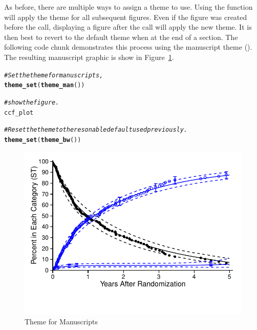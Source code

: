 \documentclass[nojss, letterpaper]{jss}\usepackage[]{graphicx}\usepackage[]{color}
\makeatletter
\def\maxwidth{ %
  \ifdim\Gin@nat@width>\linewidth
    \linewidth
  \else
    \Gin@nat@width
  \fi
}
\newcommand{\hlcom}[1]{\textcolor[rgb]{0.678,0.584,0.686}{\textit{#1}}}%
\newcommand{\hlstd}[1]{\textcolor[rgb]{0.345,0.345,0.345}{#1}}%
\newcommand{\hlkwd}[1]{\textcolor[rgb]{0.737,0.353,0.396}{\textbf{#1}}}%
\newenvironment{kframe}{%
 \def\at@end@of@kframe{}%
 \ifinner\ifhmode%
  \def\at@end@of@kframe{\end{minipage}}%
  \begin{minipage}{\columnwidth}%
 \fi\fi%
 \def\FrameCommand##1{\hskip\@totalleftmargin \hskip-\fboxsep
 \colorbox{shadecolor}{##1}\hskip-\fboxsep
     \hskip-\linewidth \hskip-\@totalleftmargin \hskip\columnwidth}%
 \MakeFramed {\advance\hsize-\width
   \@totalleftmargin\z@ \linewidth\hsize
   \@setminipage}}%
 {\par\unskip\endMakeFramed%
 \at@end@of@kframe}
\newenvironment{knitrout}{}{} %
\makeatother
\begin{document}
As before, there are multiple ways to assign a theme to use. Using the  function will apply the theme for all subsequent figures. Even if the figure was created before the  call, displaying a figure after the call will apply the new theme. It is then best to revert to the default theme when at the end of a section. The following code chunk demonstrates this process using the manuscript theme (). The resulting manuscript graphic is show in Figure~\ref{F:manuscriptTheme}.
\begin{knitrout}\footnotesize
{}\color{fgcolor}\begin{kframe}
\begin{alltt}
\hlcom{# Set the theme for manuscripts,}
\hlkwd{theme_set}\hlstd{(}\hlkwd{theme_man}\hlstd{())}

\hlcom{# show the figure.}
\hlstd{ccf_plot}

\hlcom{# Reset the theme to the resonable default used previously.}
\hlkwd{theme_set}\hlstd{(}\hlkwd{theme_bw}\hlstd{())}
\end{alltt}
\end{kframe}\begin{figure}[htpb]


{\centering \includegraphics[width=\maxwidth]{figure/beamer-manuscriptTheme} 

}

\caption[Theme for Manuscripts]{Theme for Manuscripts\label{F:manuscriptTheme}}
\end{figure}


\end{knitrout}
\end{document}
